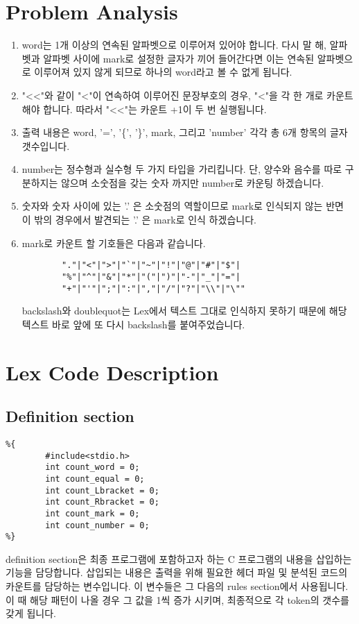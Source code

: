 \documentclass{article}
\begin{document}
\section{Problem Analysis}
\begin{enumerate}
    \item word는 1개 이상의 연속된 알파벳으로 이루어져 있어야 합니다. 다시 말 해, 알파벳과 알파벳 사이에 mark로 설정한 글자가 끼어 들어간다면 이는 연속된 알파벳으로 이루어져 있지 않게 되므로 하나의 word라고 볼 수 없게 됩니다. \\
    \item "\textless\textless"와 같이 "\textless"이 연속하여 이루어진 문장부호의 경우, "\textless"을 각 한 개로 카운트해야 합니다. 따라서 "\textless\textless"는 카운트 +1이 두 번 실행됩니다.\\
    \item 출력 내용은 word, '=', '\{', '\}', mark, 그리고 'number' 각각 총 6개 항목의 글자 갯수입니다.\\
    \item number는 정수형과 실수형 두 가지 타입을 가리킵니다. 단, 양수와 음수를 따로 구분하지는 않으며 소숫점을 갖는 숫자 까지만 number로 카운팅 하겠습니다. \\
    \item 숫자와 숫자 사이에 있는 '.' 은 소숫점의 역할이므로 mark로 인식되지 않는 반면 이 밖의 경우에서 발견되는 '.' 은 mark로 인식 하겠습니다. \\
    \item mark로 카운트 할 기호들은 다음과 같습니다. 
        \begin{lstlisting}
        "."|"<"|">"|"`"|"~"|"!"|"@"|"#"|"$"|
        "%"|"^"|"&"|"*"|"("|")"|"-"|"_"|"="|
        "+"|"'"|";"|":"|","|"/"|"?"|"\\"|"\""
        \end{lstlisting} 
        backslash와 doublequot는 Lex에서 텍스트 그대로 인식하지 못하기 때문에 해당 텍스트 바로 앞에 또 다시 backslash를 붙여주었습니다.
    
\end{enumerate}

\section{Lex Code Description}

\subsection{Definition section}
\begin{lstlisting}
%{
        #include<stdio.h>
        int count_word = 0;
        int count_equal = 0;
        int count_Lbracket = 0;
        int count_Rbracket = 0;
        int count_mark = 0;
        int count_number = 0;
%}
\end{lstlisting}
\par
definition section은 최종 프로그램에 포함하고자 하는 C 프로그램의 내용을 삽입하는 기능을 담당합니다. 삽입되는 내용은 출력을 위해 필요한 헤더 파일 및 분석된 코드의 카운트를 담당하는 변수입니다. 이 변수들은 그 다음의 rules section에서 사용됩니다. 이 때 해당 패턴이 나올 경우 그 값을 1씩 증가 시키며, 최종적으로 각 token의 갯수를 갖게 됩니다.\\
\newpage
\end{document}
